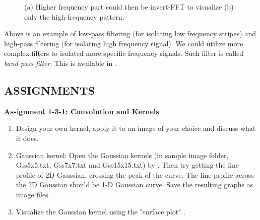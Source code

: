 \begin{figure}[htbp]
 \centering
 \caption{ (a) Higher frequency part could then be invert-FFT to visualize (b) only the high-frequency pattern.}
 \label{fig:invertToGetHighFrequencyImage}
\end{figure} 


Above is an example of low-pass filtering (for isolating low frequency
stripes) and high-pass filtering (for isolating high frequency signal).
We could utilize more complex filters to isolated more specific
frequency signals. Such filter is called \textit{band pass
filter}. This is
available in . 


\subsection{ASSIGNMENTS}

\textbf{\sffamily
Assignment 1-3-1: Convolution and Kernels
}

\begin{enumerate}
\item Design your own kernel, apply it to an image of your choice and
discuss what it does. 

\item Gaussian kernel: Open the Gaussian kernels (in sample image folder,
Gss5x5.txt, Gss7x7.txt and Gss15x15.txt) by . Then try getting the
line profile of 2D Gaussian, crossing the peak of the curve. The line
profile across the 2D Gaussian should be 1-D Gaussian curve. Save the
resulting graphs as image files. 

\item Visualize the Gaussian kernel using the "surface
plot" .
\end{enumerate}

